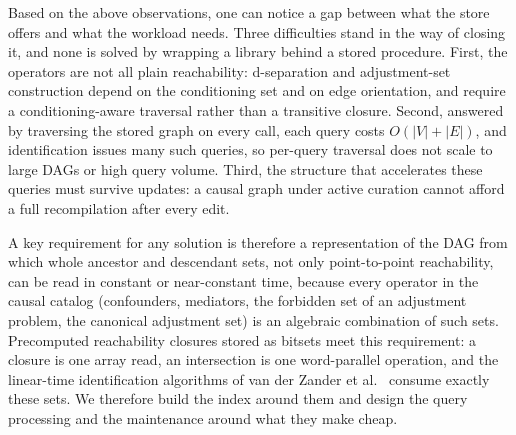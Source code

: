 Based on the above observations, one can notice a gap between what the store
offers and what the workload needs. Three difficulties stand in the way of
closing it, and none is solved by wrapping a library behind a stored
procedure. First, the operators are not all plain reachability: d-separation
and adjustment-set construction depend on the conditioning set and on edge
orientation, and require a conditioning-aware traversal rather than a
transitive closure. Second, answered by traversing the stored graph on every
call, each query costs $O(|V|+|E|)$, and identification issues many such
queries, so per-query traversal does not scale to large DAGs or high query
volume. Third, the structure that accelerates these queries must survive
updates: a causal graph under active curation cannot afford a full
recompilation after every edit.

A key requirement for any solution is therefore a representation of the DAG
from which whole ancestor and descendant sets, not only point-to-point
reachability, can be read in constant or near-constant time, because every
operator in the causal catalog (confounders, mediators, the forbidden set of
an adjustment problem, the canonical adjustment set) is an algebraic
combination of such sets. Precomputed reachability closures stored as bitsets
meet this requirement: a closure is one array read, an intersection is one
word-parallel operation, and the linear-time identification algorithms of
van der Zander et al.~\cite{vanderzander2019separators} consume exactly these
sets. We therefore build the index around them and design the query
processing and the maintenance around what they make cheap.

